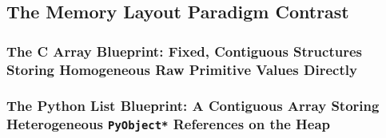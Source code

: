 \subsection{The Memory Layout Paradigm Contrast}
\subsubsection{The C Array Blueprint: Fixed, Contiguous Structures Storing Homogeneous Raw Primitive Values Directly}
\subsubsection{The Python List Blueprint: A Contiguous Array Storing Heterogeneous \texttt{PyObject*} References on the Heap}
